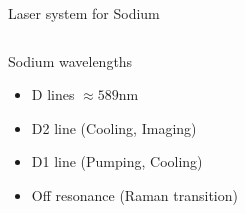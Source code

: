 \documentclass{beamer}
\begin{document}
\begin{frame}[t]{Laser system for Sodium}
  \vspace{-0.8cm}
  \begin{columns}[t]
    \column{5.8cm}
    \begin{block}{Sodium wavelengths}
      \begin{itemize}
      \item<1-> D lines $\approx589$nm
      \item<2-> D2 line (Cooling, Imaging)
      \item<3-> D1 line (Pumping, Cooling)
      \item<4-> Off resonance (Raman transition)
      \end{itemize}
    \end{block}
\end{columns}
\end{frame}
\end{document}

